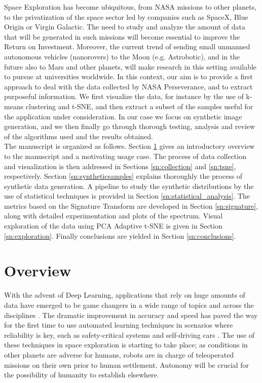 \documentclass[lettersize,journal]{IEEEtran}
\begin{document}
Space Exploration has become ubiquitous, from NASA missions to other planets, to the privatization of the space sector led by companies such as SpaceX, Blue Origin or Virgin Galactic. The need to study and analyze the amount of data that will be generated in such missions will become essential to improve the Return on Investment. Moreover, the current trend of sending small unmanned autonomous vehicles (nanorovers) to the Moon (e.g. Astrobotic), and in the future also to Mars and other planets, will make research in this setting available to pursue at universities worldwide. In this context, our aim is to provide a first approach to deal with the data collected by NASA Perseverance, and to extract purposeful information. We first visualize the data, for instance by the use of k-means clustering and t-SNE, and then extract a subset of the samples useful for the application under consideration. In our case we focus on synthetic image generation, and we then finally go through thorough testing, analysis and review of the algorithms used and the results obtained.
\\

The manuscript is organized as follows. Section \ref{sn:overview} gives an introductory overview to the manuscript and a motivating usage case. The process of data collection and visualization is then addressed in Sections \ref{sn:collection} and \ref{sn:tsne}, respectively. Section \ref{sn:syntheticsamples} explains thoroughly the process of synthetic data generation. A pipeline to study the synthetic distributions by the use of statistical techniques is provided in Section \ref{sn:statistical_analysis}. The metrics based on the Signature Transform are developed in Section \ref{sn:signature}, along with detailed experimentation and plots of the spectrum. Visual exploration of the data using PCA Adaptive t-SNE is given in Section \ref{sn:exploration}. Finally conclusions are yielded in Section \ref{sn:conclusions}.

\section{Overview}
\label{sn:overview}

With the advent of Deep Learning, applications that rely on huge amounts of data have emerged to be game changers in a wide range of topics and across the disciplines \cite{Girshick14,He15,Girshick15,Long15,Redmon16,Gatys16,Gatys16_2,He17,Vaswani2017,Wang18_2,Karras18,DeZarza22}. The dramatic improvement in accuracy and speed has paved the way for the first time to use automated learning techniques in scenarios where reliability is key, such as safety-critical systems and self-driving cars \cite{Chen17,Chen17_3,Yang18,Parmar18,Brock19,Mildenhall2020,Park20}. The use of these techniques in space exploration is starting to take place; as conditions in other planets are adverse for humans, robots are in charge of teleoperated missions on their own prior to human settlement. Autonomy will be crucial for the possibility of humanity to establish elsewhere.
\\
\end{document}
